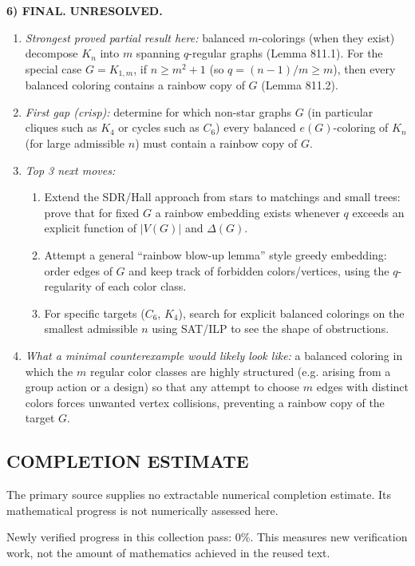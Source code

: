 \medskip
\noindent\textbf{6) FINAL.} \textbf{UNRESOLVED.}

\begin{enumerate}
\item[(i)] \emph{Strongest proved partial result here:} balanced $m$-colorings (when they exist) decompose $K_n$ into $m$ spanning $q$-regular graphs (Lemma 811.1). For the special case $G=K_{1,m}$, if $n\ge m^2+1$ (so $q=(n-1)/m\ge m$), then every balanced coloring contains a rainbow copy of $G$ (Lemma 811.2).
\item[(ii)] \emph{First gap (crisp):} determine for which non-star graphs $G$ (in particular cliques such as $K_4$ or cycles such as $C_6$) every balanced $e(G)$-coloring of $K_n$ (for large admissible $n$) must contain a rainbow copy of $G$.
\item[(iii)] \emph{Top 3 next moves:}
  \begin{enumerate}
  \item Extend the SDR/Hall approach from stars to matchings and small trees: prove that for fixed $G$ a rainbow embedding exists whenever $q$ exceeds an explicit function of $|V(G)|$ and $\Delta(G)$.
  \item Attempt a general ``rainbow blow-up lemma'' style greedy embedding: order edges of $G$ and keep track of forbidden colors/vertices, using the $q$-regularity of each color class.
  \item For specific targets ($C_6$, $K_4$), search for explicit balanced colorings on the smallest admissible $n$ using SAT/ILP to see the shape of obstructions.
  \end{enumerate}
\item[(iv)] \emph{What a minimal counterexample would likely look like:} a balanced coloring in which the $m$ regular color classes are highly structured (e.g. arising from a group action or a design) so that any attempt to choose $m$ edges with distinct colors forces unwanted vertex collisions, preventing a rainbow copy of the target $G$.
\end{enumerate}



\subsection*{COMPLETION ESTIMATE}
The primary source supplies no extractable numerical completion estimate. Its mathematical progress is not numerically assessed here.

Newly verified progress in this collection pass: $0\%$. This measures new verification work, not the amount of mathematics achieved in the reused text.

